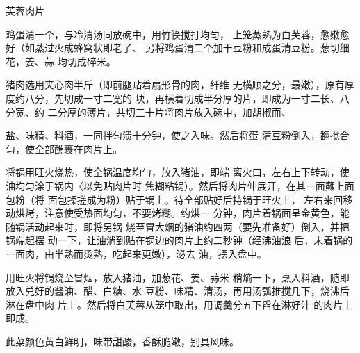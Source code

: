 \begin{recipe}{芙蓉肉片}

\ingredients



\cooking

\step 鸡蛋清一个，与冷清汤同放碗中，用竹筷搅打均匀， 上笼蒸熟为白芙蓉，愈嫩愈好（如蒸过火成蜂窝状即老了、 另将鸡蛋清二个加干豆粉和成蛋清豆粉。葱切细花，姜、蒜 均切成碎米。

\step 猪肉选用夹心肉半斤（即前腿贴着扇形骨的肉，纤维 无横顺之分，最嫩），原有厚度约八分，先切成一寸二宽的 块，再横着切成半分厚的片，即成为一寸二长、八分宽、约 二分厚的薄片，共切三十片将肉片放入碗中，加胡椒而、

盐、味精、料酒，一同拌匀溃十分钟，使之入味。然后将蛋 清豆粉倒入，翻搅合匀，使全部醮裹在肉片上。

\step 将锅用旺火烧热，使全锅温度均勻，放入猪油，即端 离火口，左右上下转动，使油均匀涂于锅内〈以免贴肉片时 焦糊粘锅）。然后将肉片伸展开，在其一面蘸上面包粉（将 面包揉搓成为粉）贴于锅上。待全部贴好后持锅于旺火上， 左右来回移动烘烤，注意使受热面均匀，不要烤糊。约烘一 分钟，肉片着锅面呈金黄色，能随锅活动起来时，即将另锅 烧至冒大烟的猪油约四两（要先准备好）倒入，并把锅端起摆 动一下，让油淌到贴在锅边的肉片上约二秒钟（经沸油浪 后，未着锅的一面肉，由半熟而烫熟，吃起来更嫩），泌去 油，摆入盘中。

\step 用旺火将锅烧至冒烟，放入猪油，加葱花、姜、蒜米 稍熵一下，烹入料酒，随即放入兑好的酱油、醋、白糖、水 豆粉、味精、清汤，再用汤瓢推搅几下，烧沸后淋在盘中肉 片上。然后将白芙蓉从笼中取出，用调羹分五下舀在淋好汁 的肉片上即成。

\notes

此菜颜色黄白鲜明，味带甜酸，香酥脆嫩，别具风味。

\end{recipe}

